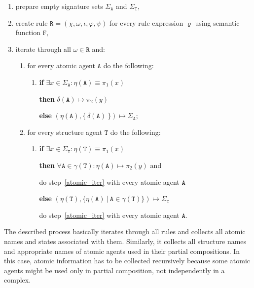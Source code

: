 \documentclass[12pt, twoside]{fithesis2} %
\begin{document}
\begin{enumerate}
\item prepare empty signature sets $\Sigma_\mathtt{A}$ and $\Sigma_\mathtt{T}$, 
\item create rule $\mathtt{R} = (\chi, \omega, \iota, \varphi, \psi)$ for every rule expression $\varrho$ using semantic function $\mathtt{F}$,
\item iterate through all $\omega \in \mathtt{R}$ and:
\begin{enumerate}
  \item \label{atomic_iter} for every atomic agent $\mathtt{A}$ do the following:
  	\begin{enumerate}
  		\item \textbf{if} $\exists x \in \Sigma_\mathtt{A}: \eta(\mathtt{A}) \equiv \pi_1(x) $ 

  		\textbf{then} $\delta(\mathtt{A}) \mapsto \pi_2(y)$

  		\textbf{else} $(\eta(\mathtt{A}), \{~\delta(\mathtt{A})~\}) \mapsto \Sigma_\mathtt{A}$;
	\end{enumerate}
  \item \label{structure_iter} for every structure agent $\mathtt{T}$ do the following:
	\begin{enumerate}
	  \item \textbf{if} $\exists x \in \Sigma_\mathtt{T}: \eta(\mathtt{T}) \equiv \pi_1(x) $

	  \textbf{then} $\forall \mathtt{A} \in \gamma(\mathtt{T}): \eta(\mathtt{A}) \mapsto \pi_2(y)$ and 

	  \hspace*{1cm} do step~\ref{atomic_iter} with every atomic agent $\mathtt{A}$

	  \textbf{else} $(\eta(\mathtt{T}), \{ \eta(\mathtt{A}) ~|~ \mathtt{A} \in \gamma(\mathtt{T}) \}) \mapsto \Sigma_\mathtt{T}$ 

	  \hspace*{0.75cm} do step~\ref{atomic_iter} with every atomic agent $\mathtt{A}$.
	\end{enumerate}
\end{enumerate}
\end{enumerate}

The described process basically iterates through all rules and collects all atomic names and states associated with them. Similarly, it collects all structure names and appropriate names of atomic agents used in their partial compositions. In this case, atomic information has to be collected recursively because some atomic agents might be used only in partial composition, not independently in a complex.
\end{document}
